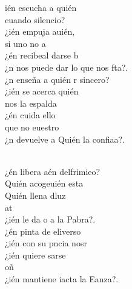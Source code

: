 \begin{cancion}%
	ién escucha a quién \\
	cuando silencio?\\
	¿ién empuja auién, \\
	si uno no a\\
	¿én recibeal darse b\\
	¿n nos puede dar lo que nos fta?.  \\
	¿n enseña a quién r sincero?  \\
	¿ién se acerca quién  \\
	nos la espalda\\
	¿én cuida ello  \\
	que no euestro\\
	¿n devuelve a Quién la confiaa?.  \\\jump\\
	\begin{chorus}%
	¿én libera aén delfrimieo? \\
	Quién acogeuién esta\\
	Quién llena dluz \\
	at \\
	¿ién le da o a la Pabra?. \\
	¿én pinta de  eliverso\\
	¿ién con su pncia nosr\\
	¿ién quiere sarse  \\
	oñ \\
	¿ién mantiene iacta la Eanza?. \\

\end{chorus}
\end{cancion}
